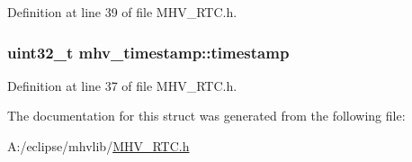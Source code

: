 Definition at line 39 of file M\-H\-V\-\_\-\-R\-T\-C.\-h.

\hypertarget{structmhv__timestamp_a0f520358e057865fb12a9153cae820c5}{
\subsubsection[{timestamp}]{\setlength{\rightskip}{0pt plus 5cm}uint32\-\_\-t mhv\-\_\-timestamp\-::timestamp}}\label{structmhv__timestamp_a0f520358e057865fb12a9153cae820c5}


Definition at line 37 of file M\-H\-V\-\_\-\-R\-T\-C.\-h.



The documentation for this struct was generated from the following file\-:\begin{DoxyCompactItemize}
\item 
A\-:/eclipse/mhvlib/\hyperlink{_m_h_v___r_t_c_8h}{M\-H\-V\-\_\-\-R\-T\-C.\-h}\end{DoxyCompactItemize}
